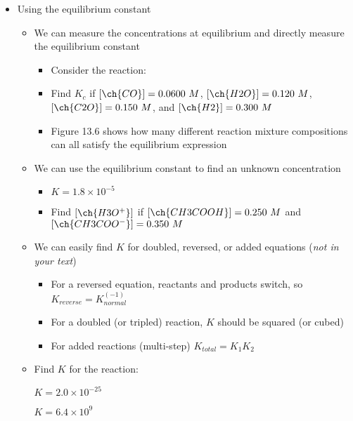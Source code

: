 \documentclass[12pt, openany, letterpaper]{memoir}
\begin{document}
\begin{itemize}
  \item Using the equilibrium constant
    \begin{itemize}
      \item We can measure the concentrations at equilibrium and directly measure the equilibrium constant
      \begin{itemize}
        \item Consider the reaction: 
        \item Find $K_c$ if $\left[\ch{CO}\right]=0.0600~M$, $\left[\ch{H2O}\right]=0.120~M$, $\left[\ch{C2O}\right]=0.150~M$, and $\left[\ch{H2}\right]=0.300~M$
        \item Figure 13.6 shows how many different reaction mixture compositions can all satisfy the equilibrium expression
      \end{itemize}
      \item We can use the equilibrium constant to find an unknown concentration
      \begin{itemize}
        \item {} \hspace{1em} $K=1.8\times10^{-5}$
        \item Find $\left[\ch{H3O^+}\right]$ if $\left[\ch{CH3COOH}\right] = 0.250~M$ and $\left[\ch{CH3COO^-}\right]=0.350~M$
      \end{itemize}
      \item We can easily find $K$ for doubled, reversed, or added equations (\emph{not in your text})
      \begin{itemize}
        \item For a reversed equation, reactants and products switch, so $K_{reverse} = K_{normal}^(-1)$
        \item For a doubled (or tripled) reaction, $K$ should be squared (or cubed)
        \item For added reactions (multi-step) $K_{total}=K_1K_2$
      \end{itemize}
      \item Find $K$ for the reaction: 
      
       \hspace{1em} $K=2.0\times10^{-25}$
      
       \hspace{1em} $K=6.4\times10^{9}$
    \end{itemize}
\end{itemize}
\end{document}
